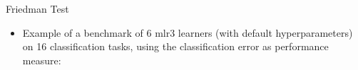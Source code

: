 \documentclass[11pt,compress,t,notes=noshow, aspectratio=169, xcolor=table]{beamer}
\begin{document}
\begin{frame}{Friedman Test}

\begin{itemize}
\item Example of a benchmark of 6 mlr3 learners (with default hyperparameters) on 16 classification tasks, using the classification error as performance measure:

\end{itemize}
    

\end{frame}
\end{document}
